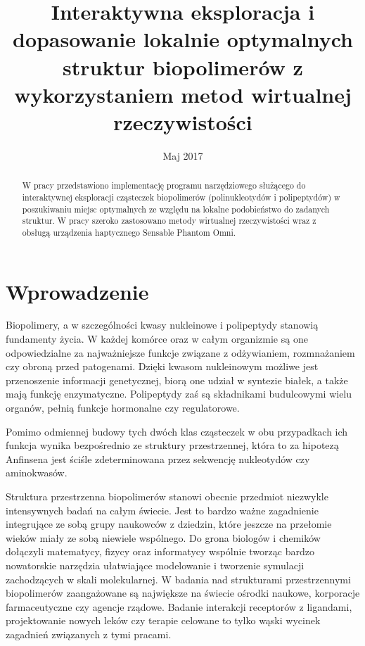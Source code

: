 \documentclass[licencjacka]{pracamgr}
\title{Interaktywna eksploracja i dopasowanie lokalnie optymalnych struktur biopolimerów z wykorzystaniem metod wirtualnej rzeczywistości}
\date{Maj 2017}
\begin{document}
\maketitle

\begin{abstract}
W pracy przedstawiono implementację programu narzędziowego służącego do interaktywnej eksploracji cząsteczek biopolimerów (polinukleotydów i polipeptydów) w poszukiwaniu miejsc optymalnych ze względu na lokalne podobieństwo do zadanych struktur. W pracy szeroko zastosowano metody wirtualnej rzeczywistości wraz z obsługą urządzenia haptycznego Sensable Phantom Omni.
\end{abstract}

\tableofcontents

\chapter*{Wprowadzenie}
Biopolimery, a w szczególności kwasy nukleinowe i polipeptydy stanowią fundamenty życia. W każdej komórce oraz w całym organizmie są one odpowiedzialne za najważniejsze funkcje związane z odżywianiem, rozmnażaniem czy obroną przed patogenami. Dzięki kwasom nukleinowym możliwe jest przenoszenie informacji genetycznej, biorą one udział w syntezie białek, a także mają funkcję enzymatyczne. Polipeptydy zaś są składnikami budulcowymi wielu organów, pełnią funkcje hormonalne czy regulatorowe.

Pomimo odmiennej budowy tych dwóch klas cząsteczek w obu przypadkach ich funkcja wynika bezpośrednio ze struktury przestrzennej, która to za hipotezą Anfinsena \cite{anfinsen73} jest ściśle zdeterminowana przez sekwencję nukleotydów czy aminokwasów.

Struktura przestrzenna biopolimerów stanowi obecnie przedmiot niezwykle intensywnych badań na całym świecie. Jest to bardzo ważne zagadnienie integrujące ze sobą grupy naukowców z dziedzin, które jeszcze na przełomie wieków miały ze sobą niewiele wspólnego. Do grona biologów i chemików dołączyli matematycy, fizycy oraz informatycy wspólnie tworząc bardzo nowatorskie narzędzia ułatwiające modelowanie i tworzenie symulacji zachodzących w skali molekularnej. W badania nad strukturami przestrzennymi biopolimerów zaangażowane są największe na świecie ośrodki naukowe, korporacje farmaceutyczne czy agencje rządowe. Badanie interakcji receptorów z ligandami, projektowanie nowych leków czy terapie celowane to tylko wąski wycinek zagadnień związanych z tymi pracami.
\end{document}
